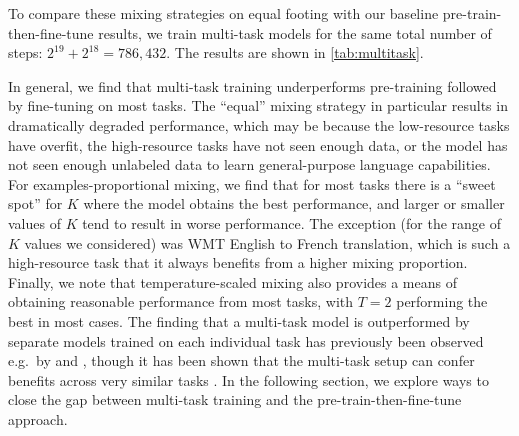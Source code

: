\documentclass[twoside,11pt]{article}
\begin{document}
To compare these mixing strategies on equal footing with our baseline pre-train-then-fine-tune results, we train multi-task models for the same total number of steps: $2^{19} + 2^{18} = 786{,}432$.
The results are shown in \cref{tab:multitask}.

In general, we find that multi-task training underperforms pre-training followed by fine-tuning on most tasks.
The ``equal'' mixing strategy in particular results in dramatically degraded performance, which may be because the low-resource tasks have overfit, the high-resource tasks have not seen enough data, or the model has not seen enough unlabeled data to learn general-purpose language capabilities.
For examples-proportional mixing, we find that for most tasks there is a ``sweet spot'' for $K$ where the model obtains the best performance, and larger or smaller values of $K$ tend to result in worse performance.
The exception (for the range of $K$ values we considered) was WMT English to French translation, which is such a high-resource task that it always benefits from a higher mixing proportion.
Finally, we note that temperature-scaled mixing also provides a means of obtaining reasonable performance from most tasks, with $T = 2$ performing the best in most cases.
The finding that a multi-task model is outperformed by separate models trained on each individual task has previously been observed e.g.\ by \citet{arivazhagan2019massively} and \citet{mccann2018natural}, though it has been shown that the multi-task setup can confer benefits across very similar tasks \cite{liu2019multi,ratner2018snorkel}.
In the following section, we explore ways to close the gap between multi-task training and the pre-train-then-fine-tune approach.
\end{document}
